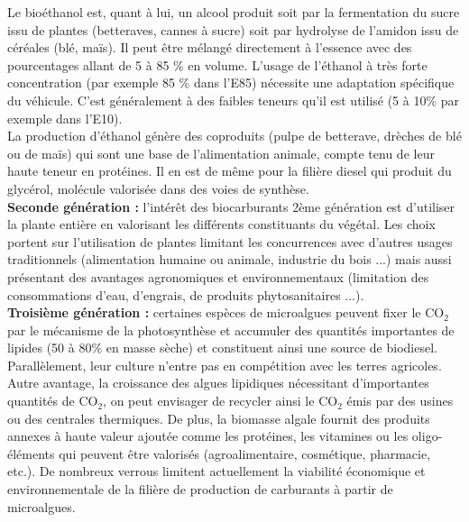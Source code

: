 \documentclass[11pt,a4paper]{report}
\begin{document}
Le bioéthanol est, quant à lui, un alcool produit soit par la fermentation du sucre issu de plantes
(betteraves, cannes à sucre) soit par hydrolyse de l'amidon issu de céréales (blé, maïs). Il peut être
mélangé directement à l'essence avec des pourcentages allant de 5 à 85 \% en volume.
L'usage de l'éthanol à très forte concentration (par exemple 85 \% dans l'E85) nécessite une
adaptation spécifique du véhicule. C'est généralement à des faibles teneurs qu'il est utilisé (5 à 10\%
par exemple dans l'E10).\\

La production d'éthanol génère des coproduits (pulpe de betterave, drèches de blé ou de maïs) qui sont une base de l'alimentation animale, compte tenu de leur haute teneur en protéines. Il en est de même pour la filière diesel qui produit du glycérol, molécule valorisée dans des voies de synthèse.\\

\textbf{Seconde génération :} l'intérêt des biocarburants 2ème génération est d'utiliser la plante entière en valorisant les différents constituants du végétal. Les choix portent sur l'utilisation de plantes limitant les concurrences avec d'autres usages traditionnels (alimentation humaine ou animale, industrie du bois ...) mais aussi présentant des avantages agronomiques et environnementaux (limitation des consommations d'eau, d'engrais, de produits phytosanitaires ...).\\

\textbf{Troisième génération :} certaines espèces de microalgues peuvent fixer le $\text{CO}_2$ par le mécanisme de la photosynthèse et accumuler des quantités importantes de lipides (50 à 80\% en masse sèche) et constituent ainsi une source de biodiesel. Parallèlement, leur culture n'entre pas en compétition avec les terres agricoles. Autre avantage, la croissance des algues lipidiques nécessitant d'importantes quantités de $\text{CO}_2$, on peut envisager de recycler ainsi le $\text{CO}_2$ émis par des usines ou des centrales thermiques. De plus, la biomasse algale fournit des produits annexes à haute valeur ajoutée comme les protéines, les vitamines ou les oligo-éléments qui peuvent être valorisés (agroalimentaire, cosmétique, pharmacie, etc.). De nombreux verrous limitent actuellement la viabilité économique et environnementale de la filière de production de carburants à partir de microalgues.
\end{document}
